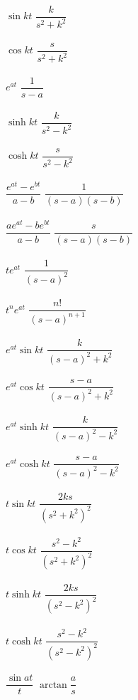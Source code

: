 \documentclass[nobib]{tufte-handout}
\begin{document}
\begin{center}
\begin{table}
\begin{tabbing}
            $\sin kt$ 	\> $\dfrac{k}{s^2+k^2}$ \>\LTNUM \\ \\
            $\cos kt$ 	\> $\dfrac{s}{s^2+k^2}$ \>\LTNUM \\ \\
            $e^{at}$ 	\> $\dfrac{1}{s-a}$ 	\>\LTNUM \\ \\
            $\sinh kt$	\> $\dfrac{k}{s^2-k^2}$ \>\LTNUM \\ \\
            $\cosh kt$	\> $\dfrac{s}{s^2-k^2}$ \>\LTNUM \\ \\
            $\dfrac{e^{at}-e^{bt}}{a-b}$	\> $\dfrac{1}{(s-a)(s-b)}$ \>\LTNUM\\ \\ 
            $\dfrac{ae^{at}-be^{bt}}{a-b}$	\> $\dfrac{s}{(s-a)(s-b)}$ \>\LTNUM\\ \\ 
            $te^{at}$	\> $\dfrac{1}{(s-a)^2}$	\>\LTNUM \\ \\
            $t^ne^{at}$	\> $\dfrac{n!}{(s-a)^{n+1}}$	\>\LTNUM \\ \\
            $e^{at}\sin kt$	\> $\dfrac{k}{(s-a)^2+k^2}$  \>\LTNUM \\ \\
            $e^{at}\cos kt$	\> $\dfrac{s-a}{(s-a)^2+k^2}$  \>\LTNUM \\ \\
            $e^{at}\sinh kt$	\> $\dfrac{k}{(s-a)^2-k^2}$  \>\LTNUM \\ \\
            $e^{at}\cosh kt$	\> $\dfrac{s-a}{(s-a)^2-k^2}$  \>\LTNUM \\ \\
            $t\sin kt$  	\> $\dfrac{2ks}{(s^2+k^2)^2}$ \>\LTNUM \\ \\
            $t\cos kt$  	\> $\dfrac{s^2-k^2}{(s^2+k^2)^2}$ \>\LTNUM \\ \\
            $t\sinh kt$  	\> $\dfrac{2ks}{(s^2-k^2)^2}$ \>\LTNUM \\ \\
            $t\cosh kt$  	\> $\dfrac{s^2-k^2}{(s^2-k^2)^2}$ \>\LTNUM \\ \\
            $\dfrac{\sin at}{t}$	\> $\arctan \dfrac{a}{s}$ \>\LTNUM \\ \\

\end{tabbing}
\end{table}
\end{center}
\end{document}
